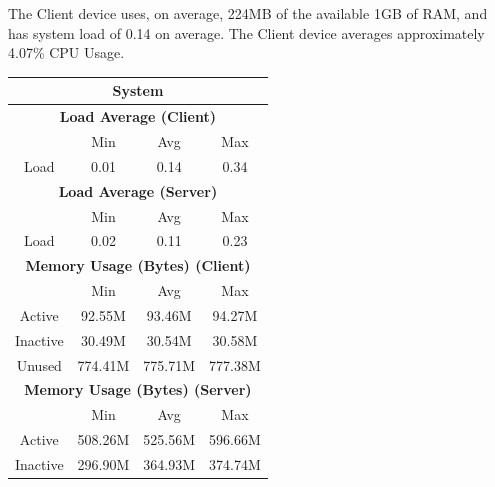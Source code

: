 \documentclass[11pt,a4paper,headinclude=false,footinclude=false]{scrreprt}
\begin{document}
The Client device uses, on average, 224MB of the available 1GB of RAM,
and has system load of 0.14 on average. The Client device averages
approximately 4.07\% CPU Usage.

\begin{table}[H]
\centering
    \begin{tabular}{||c|c|c|c|c|c|c||}
    \hline
    \multicolumn{7}{|c|}{\textbf{System}} \\
    \hline
    \multicolumn{7}{|c|}{\textbf{Load Average (Client)}} \\
    \hline\hline
      & \multicolumn{2}{|c|}{Min} & \multicolumn{2}{|c|}{Avg} & \multicolumn{2}{|c|}{Max} \\
    \hline
    Load & \multicolumn{2}{|c|}{0.01} & \multicolumn{2}{|c|}{0.14} & \multicolumn{2}{|c|}{0.34} \\
    \hline\hline
    \multicolumn{7}{|c|}{\textbf{Load Average (Server)}} \\
    \hline\hline
      & \multicolumn{2}{|c|}{Min} & \multicolumn{2}{|c|}{Avg} & \multicolumn{2}{|c|}{Max} \\
    \hline
    Load & \multicolumn{2}{|c|}{0.02} & \multicolumn{2}{|c|}{0.11} & \multicolumn{2}{|c|}{0.23} \\
    \hline\hline
    \multicolumn{7}{|c|}{\textbf{Memory Usage (Bytes) (Client)}} \\
    \hline\hline
      & \multicolumn{2}{|c|}{Min} & \multicolumn{2}{|c|}{Avg} & \multicolumn{2}{|c|}{Max} \\
    \hline
    Active & \multicolumn{2}{|c|}{92.55M} & \multicolumn{2}{|c|}{93.46M} & \multicolumn{2}{|c|}{94.27M} \\
    \hline
    Inactive & \multicolumn{2}{|c|}{30.49M} & \multicolumn{2}{|c|}{30.54M} & \multicolumn{2}{|c|}{30.58M} \\
    \hline
    Unused & \multicolumn{2}{|c|}{774.41M} & \multicolumn{2}{|c|}{775.71M} & \multicolumn{2}{|c|}{777.38M} \\
    \hline\hline
    \multicolumn{7}{|c|}{\textbf{Memory Usage (Bytes) (Server)}} \\
    \hline\hline
      & \multicolumn{2}{|c|}{Min} & \multicolumn{2}{|c|}{Avg} & \multicolumn{2}{|c|}{Max} \\
    \hline
    Active & \multicolumn{2}{|c|}{508.26M} & \multicolumn{2}{|c|}{525.56M} & \multicolumn{2}{|c|}{596.66M} \\
    \hline
    Inactive & \multicolumn{2}{|c|}{296.90M} & \multicolumn{2}{|c|}{364.93M} & \multicolumn{2}{|c|}{374.74M} \\

\end{tabular}
\end{table}
\end{document}
